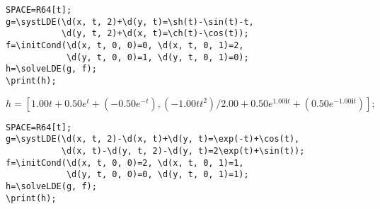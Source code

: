 \begin{verbatim}
SPACE=R64[t];
g=\systLDE(\d(x, t, 2)+\d(y, t)=\sh(t)-\sin(t)-t, 
           \d(y, t, 2)+\d(x, t)=\ch(t)-\cos(t));
f=\initCond(\d(x, t, 0, 0)=0, \d(x, t, 0, 1)=2, 
            \d(y, t, 0, 0)=1, \d(y, t, 0, 1)=0);
h=\solveLDE(g, f); 
\print(h);
\end{verbatim}

{  $h = [1. 00 t+0. 50 e^{t}+(-0. 50 e^{-t}), (-1. 00t t^{2})/2. 00+0. 50 e^{1. 00 \mathbf{i}t}+(0. 50 e^{-1. 00 \mathbf{i} t })];$} 

\begin{verbatim}
SPACE=R64[t];
g=\systLDE(\d(x, t, 2)-\d(x, t)+\d(y, t)=\exp(-t)+\cos(t), 
           \d(x, t)-\d(y, t, 2)-\d(y, t)=2\exp(t)+\sin(t));
f=\initCond(\d(x, t, 0, 0)=2, \d(x, t, 0, 1)=1, 
            \d(y, t, 0, 0)=0, \d(y, t, 0, 1)=1);
h=\solveLDE(g, f); 
\print(h);
\end{verbatim}

